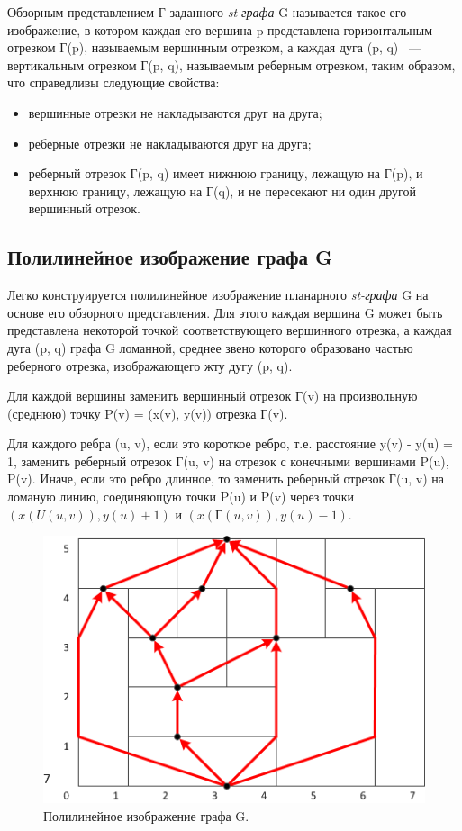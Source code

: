 Обзорным представлением Г заданного \textit{st-графа} G называется такое его изображение, в котором каждая его вершина p представлена горизонтальным отрезком Г(p), называемым вершинным отрезком, а каждая дуга (p, q) ~--- вертикальным отрезком Г(p, q), называемым реберным отрезком, таким образом, что справедливы следующие свойства:
\begin{itemize}
\item вершинные отрезки не накладываются друг на друга;
\item реберные отрезки не накладываются друг на друга;
\item реберный отрезок Г(p, q) имеет нижнюю границу, лежащую на Г(p), и верхнюю границу, лежащую на Г(q), и не пересекают ни один другой вершинный отрезок.
\end{itemize}

\subsection{Полилинейное изображение графа G}

Легко конструируется полилинейное изображение планарного \textit{st-графа} G на основе его обзорного представления. Для этого каждая вершина G может быть представлена некоторой точкой соответствующего вершинного отрезка, а каждая дуга (p, q) графа G ломанной, среднее звено которого образовано частью реберного отрезка, изображающего жту дугу (p, q).

Для каждой вершины заменить вершинный отрезок Г(v) на произвольную (среднюю) точку P(v) = (x(v), y(v)) отрезка Г(v).

Для каждого ребра (u, v), если это короткое ребро, т.е. расстояние y(v) - y(u) = 1, заменить реберный отрезок Г(u, v) на отрезок с конечными вершинами P(u), P(v). Иначе, если это ребро длинное, то заменить реберный отрезок Г(u, v) на ломаную линию, соединяющую точки P(u) и P(v) через точки $ (x(U(u, v)), y(u) + 1) $ и $ (x(Г(u, v)), y(u) - 1) $.

\begin{figure}
	\begin{center}
		\includegraphics[scale=1]{include/PolylineView.png}
	\end{center}
	\caption{Полилинейное изображение графа G.}
	\label{fig:fig16}
\end{figure}

